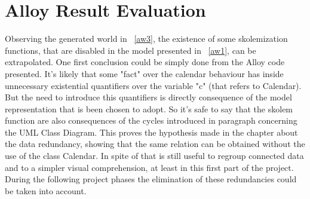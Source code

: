 \section{Alloy Result Evaluation}
Observing the generated world in \figurename~\ref{aw3}, the existence of some skolemization functions, that are disabled in the model presented in \figurename~\ref{aw1}, can be extrapolated.
One first conclusion could be simply done from the Alloy code presented. It's likely that some "fact" over the calendar behaviour has inside unnecessary existential quantifiers over the variable "c" (that refers to Calendar). But the need to introduce this quantifiers is directly consequence of the model representation that is been chosen to adopt.
So it's safe to say that the skolem function are also consequences of the cycles introduced in paragraph concerning the UML Class Diagram. This proves the hypothesis made in the chapter about the data redundancy, showing that the same relation can be obtained without the use of the class Calendar. In spite of that is still useful to regroup connected data and to a simpler visual comprehension,  at least in this first part of the project. During the following project phases the elimination of these redundancies could be taken into account. 

\acresetall